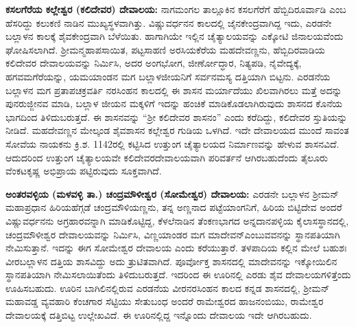 \textbf{ಕಸಲಗೆರೆಯ ಕಲ್ಲೇಶ್ವರ (ಕಲಿದೇವರ) ದೇವಾಲಯ:} ನಾಗಮಂಗಲ ತಾಲ್ಲೂಕಿನ ಕಸಲಗೆರೆಗೆ ಹೆಬ್ಬಿದಿರೂರ್ವಾಡಿ ಎಂಬ ಹೆಸರಿದ್ದು ಕಲುಕಣಿ ನಾಡಿನ ಮುಖ್ಯಸ್ಥಳವಾಗಿತ್ತು. ವಿಷ್ಣುವರ್ಧನನ ಕಾಲದಲ್ಲಿ ಜೈನಕೇಂದ್ರವಾಗಿದ್ದ ಇದು, ಎರಡನೇ ಬಲ್ಲಾಳನ ಕಾಲಕ್ಕೆ ಶೈವಕೇಂದ್ರವಾಗಿ ಬೆಳೆಯಿತು. ಹಾಗಾಗಿಯೇ ಇಲ್ಲಿನ ಚೈತ್ಯಾಲಯವನ್ನು ಎಕ್ಕೋಟಿ ಜಿನಾಲಯವೆಂದು ಘೋಷಿಸಲಾಗಿದೆ. ಶ‍್ರೀಮನ್ಮಹಾಪಸಾಯಿತ, ಪಟ್ಟಸಾಹಣಿ ಅರಸಿಯಕೆರೆಯ ಮಹದೇವಣ್ಣನು, ಹೆಬ್ಬಿದಿರವಾಡಿಯ ಕಲಿದೇವರ ದೇವಾಲಯವನ್ನು ನಿರ್ಮಿಸಿ, ಅದರ ಅಂಗಭೋಗ, ಜೀರ್ಣೋದ್ಧಾರ, ನಿತ್ಯಪಡಿ, ನೈವೇದ್ಯಕ್ಕೆ, ಹಗವಮಗೆರೆಯನ್ನು, ಯಮಯಾಂಡನ ಮಗ ಬಲ್ಲಾಳಜೀಯನಿಗೆ ಸರ್ವನಮಸ್ಯ ದತ್ತಿಯಾಗಿ ಬಿಟ್ಟನು. ಎರಡನೆಯ ಬಲ್ಲಾಳನ ಮಗ ಪ್ರತಾಪಚಕ್ರವರ್ತಿ ನರಸಿಂಹನ ಕಾಲದಲ್ಲಿ ಈ ಶಾಸನ ಮರ್ಯಾದೆಯು ಖಿಲವಾಗಿರಲು ಮತ್ತೆ ಅದನ್ನು ಪುನರುಜ್ಜೀನವ ಮಾಡಿ, ಬಲ್ಲಾಳ ಜೀಯನ ಮಕ್ಕಳಿಗೆ ಇದನ್ನು ಹಂಚಿಕೆ ಮಾಡಿಕೊಡಲಾಗಿರುವುದು ಶಾಸನದ ಕೊನೆಯ ಭಾಗದಿಂದ ತಿಳಿದುಬರುತ್ತದೆ. ಈ ಶಾಸನವನ್ನು “ಶ‍್ರೀ ಕಲಿದೇವರ ಶಾಸನಂ” ಎಂದು ಕರೆದಿದ್ದು, ಕಲಿದೇವರ ಸ್ತುತಿಯನ್ನು ನೀಡಿದೆ. ಮಹದೇವಣ್ಣನ ಮೇಲ್ಕಂಡ ಶೈವಶಾಸನ ಕಲ್ಲೇಶ್ವರ ಗುಡಿಯ ಒಳಗಿದೆ. ಇದೇ ದೇವಾಲಯದ ಮುಂದೆ ಸಾವಂತ ಸೋವೆಯ ನಾಯಕನು ಕ್ರಿ.ಶ. 1142ರಲ್ಲಿ ಕಟ್ಟಿಸಿದ ಉತ್ತುಂಗ ಚೈತ್ಯಾಲಯದ ನಿರ್ಮಾಣವನ್ನು ಹೇಳುವ ಶಾಸನವಿದೆ. ಆದುದರಿಂದ ಉತ್ತುಂಗ ಚೈತ್ಯಾಲಯವೇ ಕಲಿದೇವರ\break ದೇವಾಲಯವಾಗಿ ಪರಿವರ್ತನೆ ಆಗಿರಬಹುದೆಂದು ತೈಲೂರು ವೆಂಕಟಕೃಷ್ಣ ಅಭಿಪ್ರಾಯ ಪಟ್ಟಿರುವುದು ಸೂಕ್ತವಾಗಿದೆ.

\textbf{ಅಂತರವಳ್ಳಿಯ (ಮಳವಳ್ಳಿ ತಾ.) ಚಂದ್ರಮೌಳೀಶ್ವರ (ಸೋಮೇಶ್ವರ) ದೇವಾಲಯ:} ಎರಡನೇ ಬಲ್ಲಾಳನ ಶ‍್ರೀಮನ್​ ಮಹಾಪ್ರಧಾನ ಹಿರಿಯಹೆಗ್ಗಡೆ ಚಂದ್ರಮೌಳಿಯಣ್ಣನು, ತನ್ನ ಅಣ್ಣನಾದ ಪಟ್ಟೆಯಾಂಗನಿಗೆ, ಹಿರಿಯ ಬಿಟ್ಟಿದೇವ ಅಂದರೆ ವಿಷ್ಣುವರ್ಧನನು ಅಗ್ರಹಾರವನ್ನಾಗಿ ಮಾಡಿಕೊಟ್ಟಿದ್ದ, ಕೆಳಲೆನಾಡಿನ ತೆಂಕಣಭಾಗದ ಅನ್ನದಾನಪಳ್ಳಿಯ ಕೈಲಾಸಸ್ಥಾನದಲ್ಲಿ, ಚಂದ್ರಮೌಳೀಶ್ವರ ದೇವಾಲಯವನ್ನು ನಿರ್ಮಿಸಿ, ವಿಣ್ಣಯಾಂಡರ ಮಗ ಮಾದೇವನ್​ ಎಂಬುವವನನ್ನು ಸ್ಥಾನಪತಿಯಾಗಿ ನೇಮಿಸುತ್ತಾನೆ. ಇದನ್ನು ಈಗ ಸೋಮೇಶ್ವರ ದೇವಾಲಯ ಎಂದು ಕರೆಯುತ್ತಾರೆ. ತಳಪಾದಿಯ ಕಲ್ಲಿನ ಮೇಲೆ ಬಹುಶಃ ವೀರಬಲ್ಲಾಳನ ದತ್ತಿಯ ಶಾಸವಿದ್ದು ಅದು ತ್ರುಟಿತವಾಗಿದೆ. ಪೂರ್ವೋಕ್ತ ಶಾಸನದಲ್ಲಿ ಮಾದೇವನನ್ನು ಇಕ್ಕೋಯಿಲಿನ ಸ್ಥಾನಪತಿಯಾಗಿ ನೇಮಿಸಲಾಯಿತೆಂದು ತಿಳಿದುಬರುತ್ತದೆ. ಇದರಿಂದ ಈ ಊರಿನಲ್ಲಿ ಎರಡು ಶೈವ ದೇವಾಲಯಗಳಿತ್ತೆಂದು ಊಹಿಸಬಹುದು. ಊರಿನ ಬಾಗಿಲಿನಲ್ಲಿರುವ ಎರಡನೆಯ ವೀರನರಸಿಂಹನ ಕಾಲದ ಕನ್ನಡ ಶಾಸನದಲ್ಲಿ, ಶ‍್ರೀಮನ್​ ಮಹಾವಡ್ಡ ವ್ಯವಹಾರಿ ಕೆಂಚಗಾರ ಸೆಟ್ಟಿಯು ಸೇತುಬಂಧ ಅಂದರೆ ರಾಮೇಶ್ವರದ ಹಾಜನಂಬಿಯು, ರಾಮೇಶ್ವರ ದೇವಾಲಯಕ್ಕೆ ದತ್ತಿಬಿಟ್ಟ ಉಲ್ಲೇಖ\-ವಿದೆ. ಈ ಊರಿನಲ್ಲಿದ್ದ ಇನ್ನೊಂದು ದೇವಾಲಯ ಇದೇ ಆಗಿರಬಹುದು.


